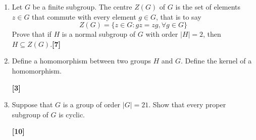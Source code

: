 \documentclass[a4paper]{article}
\begin{document}
\newpage
\begin{qns}\leavevmode
\begin{enumerate}[label=(\alph*)]
\item Let $G$ be a finite subgroup. The centre $Z(G)$ of $G$ is the set of elements $z\in G$ that commute with every element $g\in G$, that is to say
$$Z(G) = \{z\in G : gz = zg, \forall g\in G\}$$
Prove that if $H$ is a normal subgroup of $G$ with order $|H| = 2$, then $H\subseteq Z(G)$.\hfill\textbf{[7]}
\item Define a homomorphism between two groups $H$ and $G$. Define the kernel of a homomorphism.

\hfill\textbf{[3]}
\item Suppose that $G$ is a group of order $|G| = 21$. Show that every proper subgroup of $G$ is cyclic.

\hfill\textbf{[10]}
\end{enumerate}
\end{qns}
\end{document}
